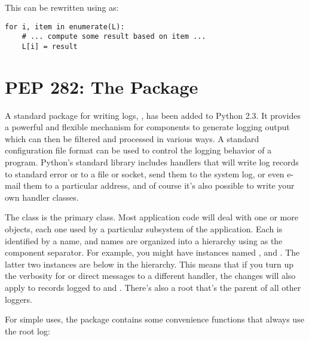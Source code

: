 \documentclass{howto}
\begin{document}
This can be rewritten using  as:

\begin{verbatim}
for i, item in enumerate(L):
    # ... compute some result based on item ...
    L[i] = result
\end{verbatim}


\begin{seealso}


\end{seealso}


\section{PEP 282: The  Package}

A standard package for writing logs, , has been added
to Python 2.3.  It provides a powerful and flexible mechanism for
components to generate logging output which can then be filtered and
processed in various ways.  A standard configuration file format can
be used to control the logging behavior of a program.  Python's
standard library includes handlers that will write log records to
standard error or to a file or socket, send them to the system log, or
even e-mail them to a particular address, and of course it's also
possible to write your own handler classes.

The  class is the primary class.
Most application code will deal with one or more 
objects, each one used by a particular subsystem of the application.
Each  is identified by a name, and names are organized
into a hierarchy using   as the component separator.  For
example, you might have  instances named ,
 and .  The latter two
instances are below  in the hierarchy.  This means that
if you turn up the verbosity for  or direct 
messages to a different handler, the changes will also apply to
records logged to  and .
There's also a root  that's the parent of all other
loggers.

For simple uses, the  package contains some
convenience functions that always use the root log:
\end{document}
